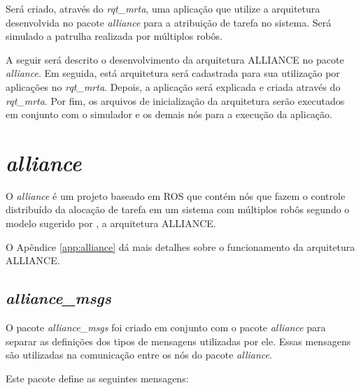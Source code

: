     Será criado, através do \textit{rqt\_mrta}, uma aplicação que utilize a arquitetura desenvolvida no pacote \textit{alliance} para a atribuição de tarefa no sistema. Será simulado a patrulha realizada por múltiplos robôs.
    
    A seguir será descrito o desenvolvimento da arquitetura ALLIANCE no pacote \textit{alliance}. Em seguida, está arquitetura será cadastrada para sua utilização por aplicações no \textit{rqt\_mrta}. Depois, a aplicação será explicada e criada através do \textit{rqt\_mrta}. Por fim, os arquivos de inicialização da arquitetura serão executados em conjunto com o simulador e os demais nós para a execução da aplicação.

    \section{\textit{alliance}} \label{sec:alliance}
        O \textit{alliance} é um projeto baseado em ROS que contém nós que fazem o controle distribuído da alocação de tarefa em um sistema com múltiplos robôs segundo o modelo sugerido por , a arquitetura ALLIANCE. 
            
        O Apêndice \ref{app:alliance} dá mais detalhes sobre o funcionamento da arquitetura ALLIANCE.
        
        \subsection{\textit{alliance\_msgs}}
            O pacote \textit{alliance\_msgs} foi criado em conjunto com o pacote \textit{alliance} para separar as definições dos tipos de mensagens utilizadas por ele. Essas mensagens são utilizadas na comunicação entre os nós do pacote \textit{alliance}.
            
            Este pacote define as seguintes mensagens:
            
